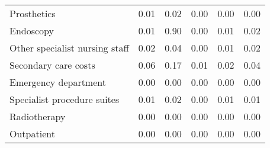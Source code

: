 \begin{tabular}{lrrrrr}
Prosthetics                    &    0.01 &  0.02 &  0.00 &  0.00 &       0.00 \\
Endoscopy                      &    0.01 &  0.90 &  0.00 &  0.01 &       0.02 \\
Other specialist nursing staff &    0.02 &  0.04 &  0.00 &  0.01 &       0.02 \\
Secondary care costs           &    0.06 &  0.17 &  0.01 &  0.02 &       0.04 \\
Emergency department           &    0.00 &  0.00 &  0.00 &  0.00 &       0.00 \\
Specialist procedure suites    &    0.01 &  0.02 &  0.00 &  0.01 &       0.01 \\
Radiotherapy                   &    0.00 &  0.00 &  0.00 &  0.00 &       0.00 \\
Outpatient                     &    0.00 &  0.00 &  0.00 &  0.00 &       0.00 \\
\bottomrule
\end{tabular}
